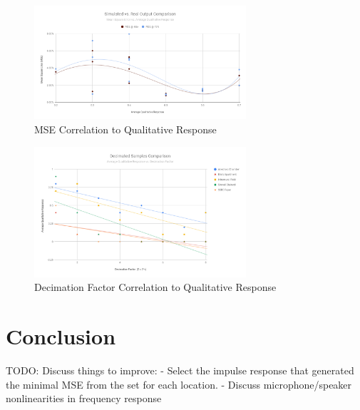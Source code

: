 \documentclass[letterpaper, 11pt, onecolumn, oneside]{article}
\begin{document}
\begin{figure}[ht]
    \includegraphics[width=0.7\textwidth]{"img/plot_SimulatedVsRealOutput"}
    \centering
    \caption{MSE Correlation to Qualitative Response}
    \label{fig:mseCorrelation}
\end{figure}

\begin{figure}[ht]
    \includegraphics[width=0.7\textwidth]{"img/plot_DecimatedSamplesComparison"}
    \centering
    \caption{Decimation Factor Correlation to Qualitative Response}
    \label{fig:decimatedCorrelation}
\end{figure}

\clearpage
\section{Conclusion}
TODO:
Discuss things to improve:
- Select the impulse response that generated the minimal MSE from the set for each location.
- Discuss microphone/speaker nonlinearities in frequency response
\end{document}
